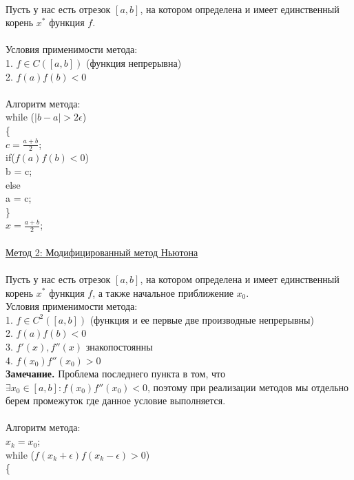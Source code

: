 \documentclass{article}
\begin{document}
	\\
	Пусть у нас есть отрезок $[a, b]$, на котором определена и имеет единственный корень $x^*$ функция $f$.\\
	\\
	Условия применимости метода:\\
	1. $f \in C([a, b])$ (функция непрерывна)\\
	2. $f(a)f(b) < 0$\\
	\\
	Алгоритм метода:\\
	while ($|b - a| > 2\epsilon$)\\
	\{\\
	\hspace*{1cm} $c = \frac{a+b}{2}$;\\
	\hspace*{1cm} if($f(a)f(b) < 0$)\\
	\hspace*{2cm} b = c;\\
	\hspace*{1cm} else\\
	\hspace*{2cm} a = c;\\
	\}\\
	$x = \frac{a+b}{2}$;\\
	\\
	\underline{Метод 2: Модифицированный метод Ньютона}\\
	\\
	Пусть у нас есть отрезок $[a, b]$, на котором определена и имеет единственный корень $x^*$ функция $f$, а также начальное приближение $x_0$.\\
	\hfill \break
	Условия применимости метода:\\
	1. $f \in C^2([a, b])$ (функция и ее первые две производные непрерывны)\\
	2. $f(a)f(b) < 0$\\
	3. $f'(x), f''(x)$ знакопостоянны\\
	4. $f(x_0)f''(x_0) > 0$\\
	\textbf{Замечание.} Проблема последнего пункта в том, что $\exists x_0\in [a, b]: f(x_0)f''(x_0) < 0$, поэтому при реализации методов мы отдельно берем промежуток где данное условие выполняется.\\
	\\
	Алгоритм метода:\\
	$x_k = x_0$;\\
	while ($f(x_k + \epsilon)f(x_k - \epsilon) > 0$)\\
	\{\\
\end{document}
